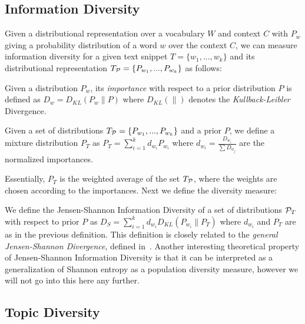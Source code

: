 \documentclass{article} %
\begin{document}

\subsection{Information Diversity}
\label{sec:information-diversity}

Given a distributional representation over a vocabulary $W$ and context $C$ with $P_w$ giving a probability distribution of a
word $w$ over the context $C$, we can measure information diversity for a given text snippet $T=\{w_1,...,w_k\}$ and its
distributional representation $T_{{\mathcal P}}=\{P_{w_1},...,P_{w_k}\}$ as follows:

\bed
Given a distribution $P_w$, its {\sl importance} with respect to a
prior distribution $P$ is defined as $D_w = D_{KL}(P_w\|P)$ where $D_{KL}(\|)$ denotes the
{\sl Kullback-Leibler} Divergence.
\eed

\bed\label{mixture}
Given a set of distributions $T_{{\mathcal P}}=\{P_{w_1},...,P_{w_k}\}$ and a
prior $P$, we
define a mixture distribution $P_T$ as $P_T=\sum_{i=1}^k d_{w_i} P_{w_i}$ where $d_{w_i}=\frac{D_{w_i}}{\sum D_{w_j}}$ are the normalized
importances.
\eed

Essentially, $P_T$ is the weighted average of the set $T_{{\mathcal P}}$, where
the weights are chosen according to the importances. Next we
define the diversity measure:

\bed\label{diversity}
We define the Jensen-Shannon Information Diversity of a set of
distributions ${\mathcal P}_T$ with respect to 
prior $P$ as $D_S=\sum_{i=1}^k d_{w_i}D_{KL}(P_{w_i}\|P_T)$
where $d_{w_i}$ and $P_T$ are as in the previous definition.
\eed
This definition is closely related to the 
{\em general Jensen-Shannon Divergence}, defined in~\cite{FugledeTopsoe}. Another
interesting theoretical property of Jensen-Shannon Information
Diversity is that it can be interpreted as a generalization of Shannon
entropy as a population diversity measure, however we will not go
into this here any further. 


\subsection{Topic Diversity}
\label{sec:topic-diversity}
\end{document}
